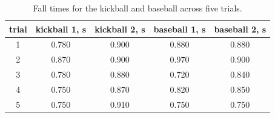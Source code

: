 \begin{table}
  \caption{Fall times for the kickball and baseball across five trials.}
  \label{tab:2}
  \begin{center}
    \begin{tabular}{ccccc}
      \toprule
        trial & kickball 1, \unit{\second} & kickball 2, \unit{\second} & baseball 1, \unit{\second} & baseball 2, \unit{\second} \\
        \midrule
        1 & \num{0.780} & \num{0.900} & \num{0.880} & \num{0.880} \\
        2 & \num{0.870} & \num{0.900} & \num{0.970} & \num{0.900} \\
        3 & \num{0.780} & \num{0.880} & \num{0.720} & \num{0.840} \\
        4 & \num{0.750} & \num{0.870} & \num{0.820} & \num{0.850} \\
        5 & \num{0.750} & \num{0.910} & \num{0.750} & \num{0.750} \\
        \bottomrule
      \end{tabular}
  \end{center}
\end{table}
